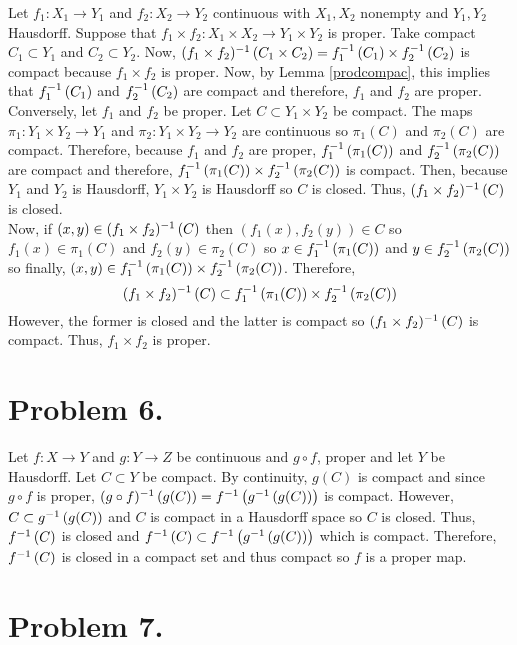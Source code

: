 \documentclass[12pt]{extarticle}
\begin{document}
Let $f_1 : X_1 \to Y_1$ and $f_2 : X_2 \to Y_2$ continuous with $X_1, X_2$ nonempty and $Y_1, Y_2$ Hausdorff. Suppose that $f_1 \times f_2 : X_1 \times X_2 \to Y_1 \times Y_2$ is proper. Take compact $C_1 \subset Y_1$ and $C_2 \subset Y_2$. Now, $(f_1 \times f_2)^{-1} \left( C_1 \times C_2 \right) = f_1^{-1} \left( C_1 \right) \times f_2^{-1} \left( C_2 \right)$ is compact because $f_1 \times f_2$ is proper. Now, by Lemma \ref{prodcompac}, this implies that $f_1^{-1} \left( C_1 \right)$ and $f_2^{-1} \left( C_2 \right)$ are compact and therefore, $f_1$ and $f_2$ are proper. \bigskip \\
Conversely, let $f_1$ and $f_2$ be proper. Let $C \subset Y_1 \times Y_2$ be compact. The maps $\pi_1 : Y_1 \times Y_2 \to Y_1$ and $\pi_2 : Y_1 \times Y_2 \to Y_2$ are continuous so $\pi_1(C)$ and $\pi_2(C)$ are compact. Therefore, because $f_1$ and $f_2$ are proper, $f_1^{-1} \left( \pi_1(C) \right)$ and $f_2^{-1} \left( \pi_2(C) \right)$ are compact and therefore, $f_1^{-1} \left( \pi_1(C) \right) \times f_2^{-1} \left( \pi_2(C) \right)$ is compact. Then, because $Y_1$ and $Y_2$ is Hausdorff, $Y_1 \times Y_2$ is Hausdorff so $C$ is closed. Thus, $(f_1 \times f_2)^{-1} \left( C \right)$ is closed. \bigskip \\ Now, if $(x, y) \in (f_1 \times f_2)^{-1} \left( C \right)$ then $(f_1(x), f_2(y)) \in C$ so $f_1(x) \in \pi_1(C)$ and $f_2(y) \in \pi_2(C)$ so $x \in f_1^{-1} \left( \pi_1(C) \right)$ and $y \in f_2^{-1} \left( \pi_2(C) \right)$ so finally, $(x, y) \in f_1^{-1} \left( \pi_1(C) \right) \times f_2^{-1} \left( \pi_2(C) \right)$. Therefore, \[(f_1 \times f_2)^{-1} \left( C \right) \subset f_1^{-1} \left( \pi_1(C) \right) \times f_2^{-1} \left( \pi_2(C) \right)\] However, the former is closed and the latter is compact so $(f_1 \times f_2)^{-1} \left( C \right)$ is compact. Thus, $f_1 \times f_2$ is proper. 

\section*{Problem 6.}

Let $f : X \to Y$ and $g : Y \to Z$ be continuous and $g \circ f$, proper and let $Y$ be Hausdorff. Let $C \subset Y$ be compact. By continuity, $g(C)$ is compact and since $g \circ f$ is proper, $(g \circ f)^{-1} \left( g(C) \right) = f^{-1} \left( g^{-1} \left( g(C) \right) \right)$ is compact. However, $C \subset g^{-1} \left( g(C) \right)$ and $C$ is compact in a Hausdorff space so $C$ is closed. Thus, $f^{-1} \left( C \right)$ is closed and $f^{-1} \left( C \right) \subset f^{-1} \left( g^{-1} \left( g(C) \right) \right)$ which is compact. Therefore, $f^{-1} \left( C \right)$ is closed in a compact set and thus compact so $f$ is a proper map.   

\section*{Problem 7.}   
\end{document}
